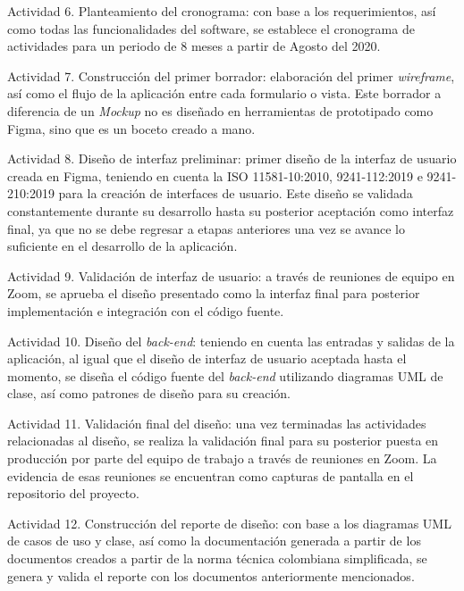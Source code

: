 \begin{APAitemize}
    \item Actividad 6. Planteamiento del cronograma: con base a los requerimientos, así como todas las funcionalidades del software, se establece el cronograma de actividades para un periodo de 8 meses a partir de Agosto del 2020.
    \item Actividad 7. Construcción del primer borrador: elaboración del primer \textit{wireframe}, así como el flujo de la aplicación entre cada formulario o vista. Este borrador a diferencia de un \textit{Mockup} no es diseñado en herramientas de prototipado como Figma, sino que es un boceto creado a mano.
    \item Actividad 8. Diseño de interfaz preliminar: primer diseño de la interfaz de usuario creada en Figma, teniendo en cuenta la ISO 11581-10:2010, 9241-112:2019 e 9241-210:2019 para la creación de interfaces de usuario. Este diseño se validada constantemente durante su desarrollo hasta su posterior aceptación como interfaz final, ya que no se debe regresar a etapas anteriores una vez se avance lo suficiente en el desarrollo de la aplicación.
    \item Actividad 9. Validación de interfaz de usuario: a través de reuniones de equipo en Zoom, se aprueba el diseño presentado como la interfaz final para posterior implementación e integración con el código fuente.
    \item Actividad 10. Diseño del \textit{back-end}: teniendo en cuenta las entradas y salidas de la aplicación, al igual que el diseño de interfaz de usuario aceptada hasta el momento, se diseña el código fuente del \textit{back-end} utilizando diagramas UML de clase, así como patrones de diseño para su creación.
    \item Actividad 11. Validación final del diseño: una vez terminadas las actividades relacionadas al diseño, se realiza la validación final para su posterior puesta en producción por parte del equipo de trabajo a través de reuniones en Zoom. La evidencia de esas reuniones se encuentran como capturas de pantalla en el repositorio del proyecto.
    \item Actividad 12. Construcción del reporte de diseño: con base a los diagramas UML de casos de uso y clase, así como la documentación generada a partir de los documentos creados a partir de la norma técnica colombiana simplificada, se genera y valida el reporte con los documentos anteriormente mencionados.
\end{APAitemize}

